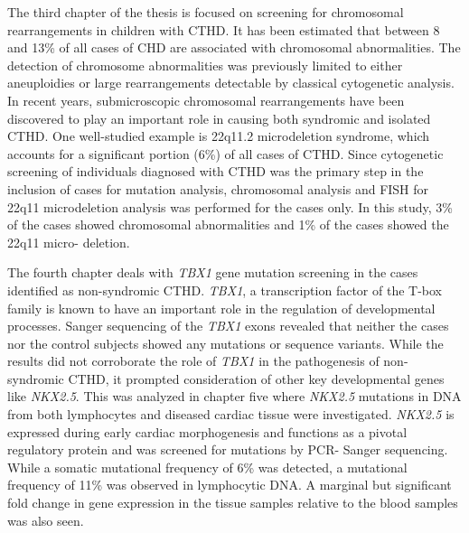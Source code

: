 The third chapter of the thesis is focused on screening for chromosomal rearrangements in children with CTHD.  It has been estimated that between 8 and 13\% of all cases of CHD are associated with chromosomal abnormalities. The detection of chromosome abnormalities was previously limited to either aneuploidies or large rearrangements detectable by classical cytogenetic analysis. In recent years, submicroscopic chromosomal rearrangements have been discovered to play an important role in causing both syndromic and isolated CTHD. One well-studied example is 22q11.2 microdeletion syndrome, which accounts for a significant portion (6\%) of all cases of CTHD. Since cytogenetic screening of individuals diagnosed with CTHD was the primary step in the inclusion of cases for mutation analysis, chromosomal analysis and FISH for 22q11 microdeletion analysis was performed for the cases only. In this study, 3\% of the cases showed chromosomal abnormalities and 1\% of the cases showed the 22q11 micro- deletion.

The fourth chapter deals with \textit{TBX1} gene mutation screening in the cases identified as non-syndromic CTHD. \textit{TBX1}, a transcription factor of the T-box family is known to have an important role in the regulation of developmental processes. Sanger sequencing of the \textit{TBX1} exons revealed that neither the cases nor the control subjects showed any mutations or sequence variants. While the results did not corroborate the role of \textit{TBX1} in the pathogenesis of non-syndromic CTHD, it prompted consideration of other key developmental genes like \textit{NKX2.5}. This was analyzed in chapter five where \textit{NKX2.5} mutations in DNA from both lymphocytes and diseased cardiac tissue were investigated. \textit{NKX2.5} is expressed during early cardiac morphogenesis and functions as a pivotal regulatory protein and was screened for mutations by PCR- Sanger sequencing. While a somatic mutational frequency of 6\% was detected, a mutational frequency of 11\% was observed in lymphocytic DNA. A marginal but significant fold change in gene expression in the tissue samples relative to the blood samples was also seen.

